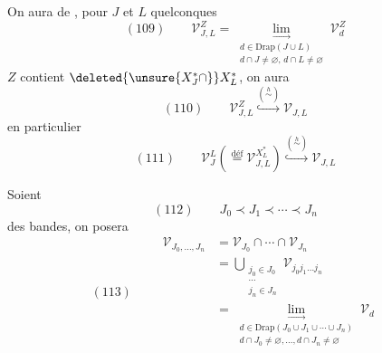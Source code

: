 
On aura de \unsure{$=$}, pour $J$ et $L$ quelconques
\[(109)\qquad\mathcal V_{J,L}^Z=\underset{\substack{d\in\mathrm{Drap}(J\cup L)\\d\cap J\ne\varnothing,\,d\cap L\ne\varnothing}}{\lim_{\longrightarrow}}\mathcal V_d^Z\]
   $Z$ contient $\deleted{\unsure{X_J^*\cap}}X_L^*$, on aura
\[(110)\qquad\mathcal V_{J,L}^Z\overset{(\overset h\sim)}{\hookrightarrow}\mathcal V_{J,L}\]
en particulier
\[(111)\qquad\mathcal V_J^L\left(\overset{\mathrm{déf}}=\mathcal V_{J,L}^{X_L^*}\right)\overset{(\overset h\sim)}{\hookrightarrow}\mathcal V_{J,L}\]

Soient
\[(112)\qquad J_0\prec J_1\prec\cdots\prec J_n\]
des bandes, on posera
\[
(113)\qquad\begin{aligned}
\mathcal V_{J_0,\ldots,J_n}&=\mathcal V_{J_0}\cap\cdots\cap\mathcal V_{J_n}\\
&=\bigcup_{\substack{j_0\in J_0\\\cdots\\j_n\in J_n}}\mathcal V_{j_0j_1\ldots j_n}\\
&=\underset{\substack{d\in\mathrm{Drap}(J_0\cup J_1\cup\cdots\cup J_n)\\d\cap J_0\ne\varnothing,\ldots,d\cap J_n\ne\varnothing}}{\lim_{\longrightarrow}}\mathcal V_d
\end{aligned}
\]
\deleted{\[\begin{aligned}
\unsure{X}&=\unsure{\overline{\mathcal V}_{J}^{L}}\\
&\unsure{Z\cap\mathcal V_J}\\
&=\unsure{X^*\cup\mathcal V_{J\cup L}\cap\mathcal V_L^*}
\end{aligned}\]}
